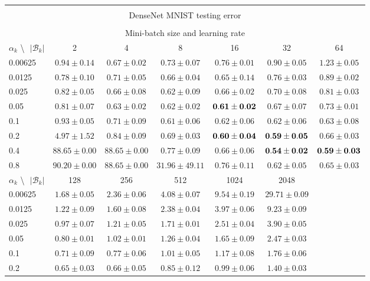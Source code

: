 \documentclass[10pt,journal,compsoc]{IEEEtran}
\begin{document}
\begin{table*}[!htbp]
\begin{center}
{\begin{tabular}{|l|c|c|c|c|c|c|}
\multicolumn{7}{|c|}{} \\
\multicolumn{7}{|c|}{DenseNet MNIST testing error} \\
\multicolumn{7}{|c|}{} \\
\hline
\multicolumn{7}{|c|}{Mini-batch size and learning rate} \\
\hline
$\alpha_k$ \textbackslash $ \text{   } {|\mathcal{B}_k|}$ & 2 & 4 & 8 & 16 & 32 & 64 \\
\hline
0.00625 & $0.94\pm0.14$ & $0.67\pm0.02$ & $0.73\pm0.07$ & $0.76\pm0.01$ & $0.90\pm0.05$ & $1.23\pm0.05$  \\
\hline
0.0125 & $0.78\pm0.10$ & $0.71\pm0.05$ & $0.66\pm0.04$ & $0.65\pm0.14$ & $0.76\pm0.03$ & $0.89\pm0.02$  \\
\hline
0.025 & $0.82\pm0.05$ & $0.66\pm0.08$ & $0.62\pm0.09 $ & $0.66\pm0.02$ & $0.70\pm0.08$ & $0.81\pm0.03$  \\
\hline
0.05  & $0.81\pm0.07$ & $0.63\pm0.02$ & $0.62\pm0.02$ & $\bf 0.61\pm0.02$ & $0.67\pm0.07$ & $0.73\pm0.01$  \\
\hline
0.1   & $0.93\pm0.05$ & $0.71\pm0.09$ & $0.61\pm0.06$ & $0.62\pm0.06$ & $ 0.62\pm0.06$ & $0.63\pm0.08$  \\
\hline
0.2   & $4.97\pm1.52$ & $0.84\pm0.09$ & $0.69\pm0.03$ & $\bf 0.60\pm0.04$ & $\bf 0.59\pm0.05$ & $0.66\pm0.03$  \\
\hline
0.4   & $88.65\pm0.00$ & $88.65\pm0.00$ & $0.77\pm0.09$ & $0.66\pm0.06$ & $\bf 0.54\pm0.02$ & $\bf 0.59\pm0.03$  \\
\hline
0.8   & $90.20\pm0.00$ & $88.65\pm0.00$ & $31.96\pm49.11$ & $0.76\pm0.11$ & $0.62\pm0.05$ & $0.65\pm0.03$ \\
\hline
$\alpha_k$ \textbackslash $\text{   } {|\mathcal{B}_k|}$ & 128 & 256 & 512 & 1024 & 2048 & \\
\hline
0.00625 & $1.68\pm0.05$ & $2.36\pm0.06$ & $4.08\pm0.07$ & $9.54\pm0.19$ & $29.71\pm0.09$ &  \\
\hline
0.0125 & $1.22\pm0.09$ & $1.60\pm0.08$ & $2.38\pm0.04$ & $3.97\pm0.06$ & $9.23\pm0.09$ &  \\
\hline
0.025 & $0.97\pm0.07$ & $1.21\pm0.05$ & $1.71\pm0.01$ & $2.51\pm0.04$ & $3.90\pm0.05$ &  \\
\hline
0.05  & $0.80\pm0.01$ & $1.02\pm0.01$ & $1.26\pm0.04$ & $1.65\pm0.09$ & $2.47\pm0.03$ &  \\
\hline
0.1   & $0.71\pm0.09$ & $0.77\pm0.06$ & $1.01\pm0.05$ & $1.17\pm0.08$ & $1.76\pm0.06$ &  \\
\hline
0.2   & $0.65\pm0.03$ & $0.66\pm0.05$ & $0.85\pm0.12$ & $0.99\pm0.06$ & $1.40\pm0.03$ &  \\

\end{tabular}}
\end{center}
\end{table*}
\end{document}

